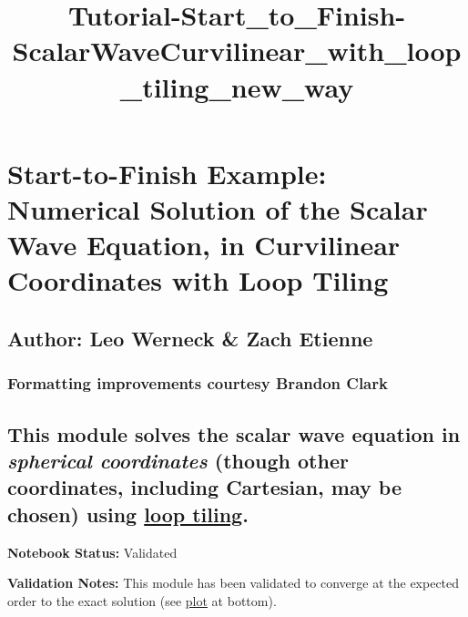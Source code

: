 \documentclass[landscape,letterpaper,10pt,english]{article}
\title{Tutorial-Start\_to\_Finish-ScalarWaveCurvilinear\_with\_loop\_tiling\_new\_way}
\begin{document}
    
    \maketitle
    
    

    
    \hypertarget{start-to-finish-example-numerical-solution-of-the-scalar-wave-equation-in-curvilinear-coordinates-with-loop-tiling}{%
\section{Start-to-Finish Example: Numerical Solution of the Scalar Wave
Equation, in Curvilinear Coordinates with Loop
Tiling}\label{start-to-finish-example-numerical-solution-of-the-scalar-wave-equation-in-curvilinear-coordinates-with-loop-tiling}}

\hypertarget{author-leo-werneck-zach-etienne}{%
\subsection{Author: Leo Werneck \& Zach
Etienne}\label{author-leo-werneck-zach-etienne}}

\hypertarget{formatting-improvements-courtesy-brandon-clark}{%
\subsubsection{Formatting improvements courtesy Brandon
Clark}\label{formatting-improvements-courtesy-brandon-clark}}

\hypertarget{this-module-solves-the-scalar-wave-equation-in-spherical-coordinates-though-other-coordinates-including-cartesian-may-be-chosen-using-loop-tiling.}{%
\subsection{\texorpdfstring{This module solves the scalar wave equation
in \emph{spherical coordinates} (though other coordinates, including
Cartesian, may be chosen) using
\href{https://en.wikipedia.org/wiki/Loop_nest_optimization}{loop
tiling}.}{This module solves the scalar wave equation in spherical coordinates (though other coordinates, including Cartesian, may be chosen) using loop tiling.}}\label{this-module-solves-the-scalar-wave-equation-in-spherical-coordinates-though-other-coordinates-including-cartesian-may-be-chosen-using-loop-tiling.}}

\textbf{Notebook Status:} Validated

\textbf{Validation Notes:} This module has been validated to converge at
the expected order to the exact solution (see
\hyperref[convergence]{plot} at bottom).
\end{document}
